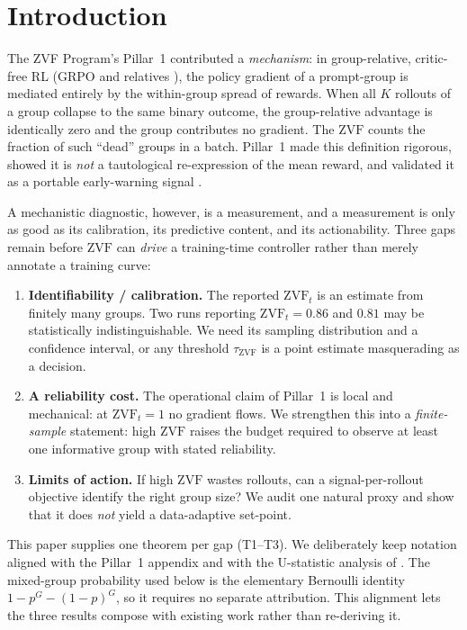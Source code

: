 \documentclass[11pt]{article}
\theoremstyle{plain}
\theoremstyle{definition}
\theoremstyle{remark}
\newcommand{\ZVF}{\ensuremath{\mathrm{ZVF}}}
\newcommand{\1}{\mathbb{1}}
\begin{document}
\section{Introduction}
The ZVF Program's Pillar~1 contributed a \emph{mechanism}: in group-relative,
critic-free RL (GRPO and relatives \cite{shao2024deepseekmath}), the policy gradient
of a prompt-group is mediated entirely by the within-group spread of rewards.
When all $K$ rollouts of a group collapse to the same binary outcome, the
group-relative advantage is identically zero and the group contributes no
gradient. The \ZVF{} counts the fraction of such ``dead'' groups in a batch.
Pillar~1 made this definition rigorous, showed it is \emph{not} a tautological
re-expression of the mean reward, and validated it as a portable early-warning
signal \cite{zvfaudit2026}.

A mechanistic diagnostic, however, is a measurement, and a measurement is only
as good as its calibration, its predictive content, and its actionability.
Three gaps remain before \ZVF{} can \emph{drive} a training-time controller
rather than merely annotate a training curve:

\begin{enumerate}[leftmargin=1.5em,itemsep=2pt]
  \item \textbf{Identifiability / calibration.} The reported $\ZVF_t$ is an
        estimate from finitely many groups. Two runs reporting
        $\ZVF_t = 0.86$ and $0.81$ may be statistically indistinguishable. We
        need its sampling distribution and a confidence interval, or any
        threshold $\tau_{\ZVF}$ is a point estimate masquerading as a decision.
  \item \textbf{A reliability cost.} The operational claim of Pillar~1 is local
        and mechanical: at $\ZVF_t = 1$ no gradient flows. We strengthen this
        into a \emph{finite-sample} statement: high \ZVF{} raises the budget
        required to observe at least one informative group with stated reliability.
  \item \textbf{Limits of action.} If high \ZVF{} wastes rollouts, can a
        signal-per-rollout objective identify the right group size? We audit one
        natural proxy and show that it does \emph{not} yield a data-adaptive
        set-point.
\end{enumerate}

This paper supplies one theorem per gap (T1--T3). We deliberately keep
notation aligned with the Pillar~1 appendix and with the U-statistic analysis
of \citet{zhou2026demystifyinggrpo}. The mixed-group probability used below is
the elementary Bernoulli identity $1-p^G-(1-p)^G$, so it requires no separate
attribution. This alignment lets the three results compose with existing work
rather than re-deriving it.
\end{document}
